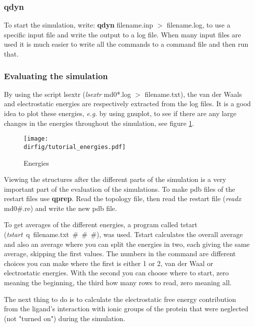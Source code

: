 \documentclass[a4paper,10pt]{article}
\newcommand{\dirfig}{./pictures}
\begin{document}
\subsubsection{\textbf{qdyn}}
To  start  the  simulation,   write:  \textbf{qdyn}  filename.inp  $>$
filename.log, to use  a specific input file and write  the output to a
log file. When  many input files are  used it is much  easier to write
all the commands to a command file and then run that.

\subsubsection{Evaluating the simulation}
By   using   the   script   lsextr   (\textit{lsextr}   md0*.log   $>$
filename.txt),  the  van  der  Waals and  electrostatic  energies  are
respectively extracted from  the log files. It is a  good idea to plot
these energies,  \textit{e.g.} by using  gnuplot, to see if  there are
any  large changes  in  the energies  throughout  the simulation,  see
figure \ref{fig:tutorial_energies}.

\begin{figure}[h]
\centerline{\texttt{[image: \\dirfig/tutorial\_energies.pdf]}}
\caption{Energies} \label{fig:tutorial_energies}
\end{figure}

Viewing the structures after the  different parts of the simulation is
a very  important part of the  evaluation of the simulations.  To make
pdb files of  the restart files use \textbf{qprep}.  Read the topology
file, then read the restart file (\textit{readx }md0{\#}.re) and write
the new pdb file.

To get  averages of  the different energies,  a program  called tstart
(\textit{tstart~}{\-}q~filename.txt~{\#}~{\#}~{\#}), was used.  Tstart
calculates the overall average and also an average where you can split
the energies in two, each giving  the same average, skipping the first
values. The numbers in the command  are different choices you can make
where  the first  is either  1  or 2,  van der  Waal or  electrostatic
energies. With the second you can  choose where to start, zero meaning
the beginning, the third how many rows to read, zero meaning all.

The next  thing to do  is to  calculate the electrostatic  free energy
contribution from  the ligand's interaction  with ionic groups  of the
protein   that   were  neglected   (not   "turned   on")  during   the
simulation.
\end{document}
